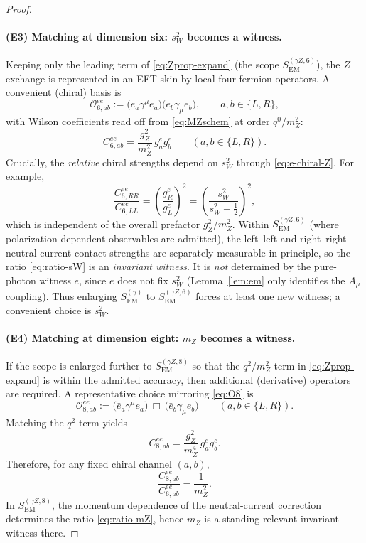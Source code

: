 \documentclass[11pt]{article}
\theoremstyle{remark}
\newcommand{\EM}{\ensuremath{\mathrm{EM}}}
\begin{document}
\begin{proof}
\paragraph{(E3) Matching at dimension six: $s_W^2$ becomes a witness.}
Keeping only the leading term of \eqref{eq:Zprop-expand} (the scope $S_{\EM}^{(\gamma Z,6)}$), the $Z$ exchange
is represented in an EFT skin by local four-fermion operators. A convenient (chiral) basis is
\begin{equation}\label{eq:O6em}
\mathcal{O}^{ee}_{6,ab}:=\big(\bar e_a\gamma^\mu e_a\big)\big(\bar e_b\gamma_\mu e_b\big),\qquad a,b\in\{L,R\},
\end{equation}
with Wilson coefficients read off from \eqref{eq:MZschem} at order $q^0/m_Z^2$:
\begin{equation}\label{eq:C6em}
C^{ee}_{6,ab}=\frac{g_Z^2}{m_Z^2}\,g_a^e g_b^e\qquad (a,b\in\{L,R\}).
\end{equation}
Crucially, the \emph{relative} chiral strengths depend on $s_W^2$ through \eqref{eq:e-chiral-Z}. For example,
\begin{equation}\label{eq:ratio-sW}
\frac{C^{ee}_{6,RR}}{C^{ee}_{6,LL}}=\left(\frac{g_R^e}{g_L^e}\right)^2
=\left(\frac{s_W^2}{s_W^2-\tfrac12}\right)^2,
\end{equation}
which is independent of the overall prefactor $g_Z^2/m_Z^2$.
Within $S_{\EM}^{(\gamma Z,6)}$ (where polarization-dependent observables are admitted), the left--left and
right--right neutral-current contact strengths are separately measurable in principle, so the ratio
\eqref{eq:ratio-sW} is an \emph{invariant witness}. It is \emph{not} determined by the pure-photon witness $e$,
since $e$ does not fix $s_W^2$ (Lemma~\ref{lem:em} only identifies the $A_\mu$ coupling).
Thus enlarging $S_{\EM}^{(\gamma)}$ to $S_{\EM}^{(\gamma Z,6)}$ forces at least one new witness; a convenient
choice is $s_W^2$.

\paragraph{(E4) Matching at dimension eight: $m_Z$ becomes a witness.}
If the scope is enlarged further to $S_{\EM}^{(\gamma Z,8)}$ so that the $q^2/m_Z^2$ term in
\eqref{eq:Zprop-expand} is within the admitted accuracy, then additional (derivative) operators are required.
A representative choice mirroring \eqref{eq:O8} is
\begin{equation}\label{eq:O8em}
\mathcal{O}^{ee}_{8,ab}:=\big(\bar e_a\gamma^\mu e_a\big)\,\Box\,\big(\bar e_b\gamma_\mu e_b\big)
\qquad (a,b\in\{L,R\}).
\end{equation}
Matching the $q^2$ term yields
\begin{equation}\label{eq:C8em}
C^{ee}_{8,ab}=\frac{g_Z^2}{m_Z^4}\,g_a^e g_b^e.
\end{equation}
Therefore, for any fixed chiral channel $(a,b)$,
\begin{equation}\label{eq:ratio-mZ}
\frac{C^{ee}_{8,ab}}{C^{ee}_{6,ab}}=\frac{1}{m_Z^2}.
\end{equation}
In $S_{\EM}^{(\gamma Z,8)}$, the momentum dependence of the neutral-current correction determines the ratio
\eqref{eq:ratio-mZ}, hence $m_Z$ is a standing-relevant invariant witness there.


\end{proof}
\end{document}
